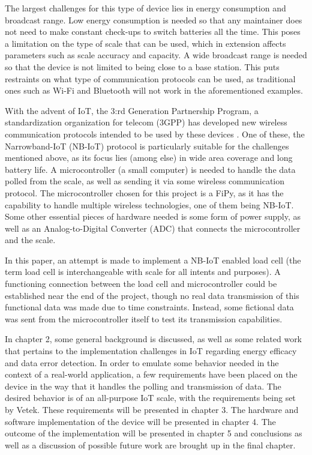 The largest challenges for this type of device lies in energy consumption and broadcast range. Low energy consumption is needed so that any maintainer does not need to make constant check-ups to switch batteries all the time. This poses a limitation on the type of scale that can be used, which in extension affects parameters such as scale accuracy and capacity. A wide broadcast range is needed so that the device is not limited to being close to a base station. This puts restraints on what type of communication protocols can be used, as traditional ones such as Wi-Fi and Bluetooth will not work in the aforementioned examples.

With the advent of IoT, the 3:rd Generation Partnership Program, a standardization organization for telecom (3GPP) has developed new wireless communication protocols intended to be used by these devices \cite{3gpp}. One of these, the Narrowband-IoT (NB-IoT) protocol is particularly suitable for the challenges mentioned above, as its focus lies (among else) in wide area coverage and long battery life. A microcontroller (a small computer) is needed to handle the data polled from the scale, as well as sending it via some wireless communication protocol. The microcontroller chosen for this project is a FiPy, as it has the capability to handle multiple wireless technologies, one of them being NB-IoT. Some other essential pieces of hardware needed is some form of power supply, as well as an Analog-to-Digital Converter (ADC) that connects the microcontroller and the scale.

In this paper, an attempt is made to implement a NB-IoT enabled load cell (the term load cell is interchangeable with scale for all intents and purposes). A functioning connection between the load cell and microcontroller could be established near the end of the project, though no real data transmission of this functional data was made due to time constraints. Instead, some fictional data was sent from the microcontroller itself to test its transmission capabilities.

In chapter 2, some general background is discussed, as well as some related work that pertains to the implementation challenges in IoT regarding energy efficacy and data error detection.
In order to emulate some behavior needed in the context of a real-world application, a few requirements have been placed on the device in the way that it handles the polling and transmission of data. The desired behavior is of an all-purpose IoT scale, with the requirements being set by Vetek.  These requirements will be presented in chapter 3.
The hardware and software implementation of the device will be presented in chapter 4.
The outcome of the implementation will be presented in chapter 5 and
conclusions as well as a discussion of possible future work are brought up in the final chapter.
